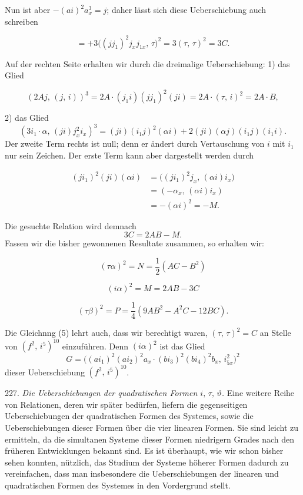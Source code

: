 \documentclass[11pt]{article}
\providecommand{\weberpage}[1]{}
\providecommand{\weq}[2]{\begin{equation}\tag{#1}#2\end{equation}}
\begin{document}
\weberpage{251}

Nun ist aber $-(ai)^2a_x^3 = j$; daher lässt sich diese Ueberschiebung auch schreiben

\weq{1}{= +3\big((jj_1)^2j_xj_{1x},\,\tau\big)^2 = 3(\tau,\,\tau)^2 = 3C.}

Auf der rechten Seite erhalten wir durch die dreimalige Ueberschiebung: 1) das Glied

\weq{2}{(2Aj,\,(j,\,i))^3 = 2A\cdot(j_1i)(jj_1)^2(ji) = 2A\cdot(\tau,\,i)^2 = 2A\cdot B,}

2) das Glied
\[
(3i_1\cdot\alpha,\,(ji)j_x^2i_x)^3 = (ji)(i_1j)^2(\alpha i) + 2(ji)(\alpha j)(i_1j)(i_1i).
\]
Der zweite Term rechts ist null; denn er ändert durch Vertauschung von $i$ mit $i_1$ nur sein Zeichen. Der erste Term kann aber dargestellt werden durch

\weq{3}{\begin{aligned}
(ji_1)^2(ji)(\alpha i) &= \big((ji_1)^2j_x,\,(\alpha i)i_x\big)\\
&= (-\alpha_x,\,(\alpha i)i_x)\\
&= -(\alpha i)^2 = -M.
\end{aligned}}

Die gesuchte Relation wird demnach
\[
3C = 2AB - M.
\]
Fassen wir die bisher gewonnenen Resultate zusammen, so erhalten wir:

\weq{4}{(\tau\alpha)^2 = N = \frac{1}{2}(AC-B^2)}

\weq{5}{(i\alpha)^2 = M = 2AB - 3C}

\weq{6}{(\tau\beta)^2 = P = \frac{1}{4}(9AB^2 - A^2C - 12BC).}

Die Gleichnng (5) lehrt auch, dass wir berechtigt waren, $(\tau,\,\tau)^2 = C$ an Stelle von $(f^2,\,i^5)^{10}$ einzuführen. %
Denn $(i\alpha)^2$ ist das Glied
\[
G = \big((ai_1)^2(ai_2)^2a_x\cdot(bi_3)^2(bi_4)^2b_x,\,i_{5x}^2\big)^2
\]
dieser Ueberschiebung $(f^2,\,i^5)^{10}$.

227. \textit{Die Ueberschiebungen der quadratischen Formen $i,\,\tau,\,\vartheta$.} Eine weitere Reihe von Relationen, deren wir später bedürfen, liefern die gegenseitigen Ueberschiebungen der quadratischen Formen des Systemes, sowie die Ueberschiebungen dieser Formen über die vier linearen Formen. Sie sind leicht zu ermitteln, da die simultanen Systeme dieser Formen niedrigern Grades nach den früheren Entwicklungen bekannt sind. Es ist überhaupt, wie wir schon bisher sehen konnten, nützlich, das Studium der Systeme höherer Formen dadurch zu vereinfachen, dass man insbesondere die Ueberschiebungen der linearen und quadratischen Formen des Systemes in den Vordergrund stellt.
\end{document}
